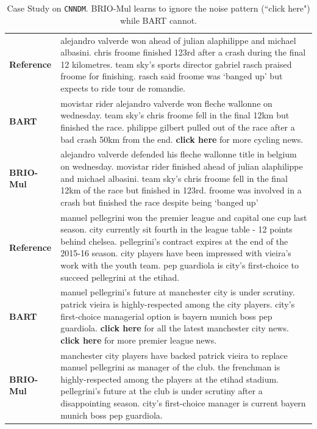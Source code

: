 \documentclass[11pt]{article}
\newcommand{\model}{BRIO\xspace}
\begin{document}
\begin{table}[t!]
\begin{tabular}{@{} c  p{}}
  \midrule
   \multicolumn{1}{l}{ \bf Reference} & \cellcolor{gray!25} alejandro valverde won ahead of julian alaphilippe and michael albasini. chris froome finished 123rd after a crash during the final 12 kilometres. team sky's sports director gabriel rasch praised froome for finishing. rasch said froome was `banged up' but expects to ride tour de romandie. \\
    \multicolumn{1}{l}{ \bf BART }&  movistar rider alejandro valverde won fleche wallonne on wednesday. team sky's chris froome fell in the final 12km but finished the race. philippe gilbert pulled out of the race after a bad crash 50km from the end. \textbf{click here} for more cycling news. \\
    \multicolumn{1}{l}{ \bf \model-Mul} & \cellcolor{gray!25} alejandro valverde defended his fleche wallonne title in belgium on wednesday. movistar rider finished ahead of julian alaphilippe and michael albasini. team sky's chris froome fell in the final 12km of the race but finished in 123rd. froome was involved in a crash but finished the race despite being `banged up' \\
\midrule
\multicolumn{1}{l}{ \bf Reference} & \cellcolor{gray!25} manuel pellegrini won the premier league and capital one cup last season. city currently sit fourth in the league table - 12 points behind chelsea. pellegrini's contract expires at the end of the 2015-16 season. city players have been impressed with vieira's work with the youth team. pep guardiola is city's first-choice to succeed pellegrini at the etihad. \\
   \multicolumn{1}{l}{ \bf BART} &  manuel pellegrini's future at manchester city is under scrutiny. patrick vieira is highly-respected among the city players. city's first-choice managerial option is bayern munich boss pep guardiola. \textbf{click here} for all the latest manchester city news. \textbf{click here} for more premier league news. \\
    \multicolumn{1}{l}{ \bf \model-Mul }& \cellcolor{gray!25} manchester city players have backed patrick vieira to replace manuel pellegrini as manager of the club. the frenchman is highly-respected among the players at the etihad stadium. pellegrini's future at the club is under scrutiny after a disappointing season. city's first-choice manager is current bayern munich boss pep guardiola. \\
    
  \bottomrule
\end{tabular}
\vspace{-5pt}
\caption{Case Study on \texttt{CNNDM}. \model-Mul learns to ignore the noise pattern (``click here") while BART cannot.}
\vspace{-8pt}
\label{tab:example}
\end{table}
\end{document}
